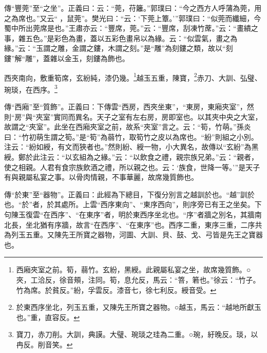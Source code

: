 {\noindent\zhuan{}\fzbyks 傳“豐莞”至“之坐”。正義曰：云：“莞，苻籬。”郭璞曰：“今之西方人呼蒲為莞，用之為席也。”又云“𦸣，鼠莞”。樊光曰：“云：‘下莞上簟。’”郭璞曰：“似莞而纖細，今蜀中所出莞席是也。”王肅亦云：“豐席，莞。”云：“豐席，刮凍竹蓆。”云：“畫繢之事，雜五色。”是彩色為畫，蓋以五彩色畫帛以為緣。云：“似雲氣，畫之為緣。”云：“玉謂之雕，金謂之鏤，木謂之刻。”是“雕”為刻鏤之類，故以“刻鏤”解“雕”，蓋雜以金玉，刻鏤為飾也。 \par}

西夾南向，敷重筍席，玄紛純，漆仍幾。\footnote{西廂夾室之前。筍，蒻竹。玄紛，黑綬。此親屬私宴之坐，故席幾質飾。○夾，工洽反，徐音頰，注同。筍，息允反，馬云：“箁，箬也。”徐云：“竹子。竹為席。於貧反。”紛，孚雲反。漆音七，徐七利反。綬音受。}越玉五重，陳寶，\footnote{於東西序坐北，列玉五重，又陳先王所寶之器物。○越玉，馬云：“越地所獻玉也。”重，直容反。}赤刀、大訓、弘璧、琬琰，在西序。\footnote{寶刀，赤刀削。大訓，典謨。大璧、琬琰之珪為二重。○琬，紆晚反。琰，以冉反。削音笑。}


{\noindent\zhuan{}\fzbyks 傳“西廂”至“質飾”。正義曰：下傳雲“西房，西夾坐東”，“東房，東廂夾室”，然則“房”與“夾室”實同而異名。天子之室有左右房，房即室也。以其夾中央之大室，故謂之“夾室”。此坐在西廂夾室之前，故系“夾室”言之。云：“筍，竹萌。”孫炎曰：“竹初萌生謂之筍。”是“筍”為蒻竹，取筍竹之皮以為席也。“紛”則組之小別。注云：“紛如綬，有文而狹者也。”然則紛、綬一物，小大異名，故傳以“玄紛”為黑綬。鄭於此注云：“以玄組為之緣。”云：“以飲食之禮，親宗族兄弟。”云：“親者，使之相親。人君有食宗族飲酒之禮，所以親之也。云：‘族食，世降一等。’”是天子有與親屬私宴之事。以骨肉情親，不事華麗，故席幾質飾也。 \par}

{\noindent\zhuan{}\fzbyks 傳“於東”至“器物”。正義曰：此經為下總目，下復分別言之越訓於也。“越”訓於也。“於”者，於其處所。上雲“西序東向”、“東序西向”，則序旁已有王之坐矣。下句陳玉復雲“在西序”、“在東序”者，明於東西序坐北也。“序”者牆之別名，其牆南北長，坐北猶有序牆，故言“在西序”、“在東序”也。西序二重，東序三重，二序共為列玉五重。又陳先王所寶之器物，河圖、大訓、貝、鼓、戈、弓皆是先王之寶器也。 \par}


